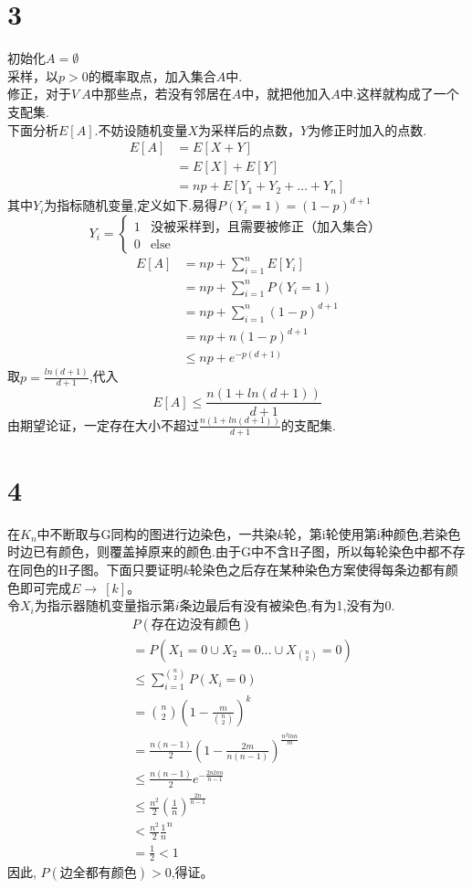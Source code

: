 \documentclass[a4paper,twocolumn]{ctexart}
\begin{document}
\section*{3}
\noindent 初始化$A=\emptyset$\\
采样，以$p>0$的概率取点，加入集合$A$中.\\
修正，对于$V\ A$中那些点，若没有邻居在$A$中，就把他加入$A$中.这样就构成了一个支配集.\\
下面分析$E[A]$.不妨设随机变量$X$为采样后的点数，$Y$为修正时加入的点数.
\begin{align*}
E[A]&=E[X+Y]\\
&=E[X]+E[Y]\\
&=np+E[Y_1+Y_2+\ldots+Y_{n}]
\end{align*}
其中$Y_i$为指标随机变量,定义如下.易得$P(Y_i=1)=(1-p)^{d+1}$
\[Y_i=
\begin{cases}
1 &\text{没被采样到，且需要被修正（加入集合）}\\
0 & \text{else}
\end{cases}
\]
\begin{align*}
E[A]&=np+\sum_{i=1}^{n}E[Y_i]\\
&=np+\sum_{i=1}^{n}P(Y_i=1)\\
&=np+\sum_{i=1}^{n}(1-p)^{d+1}\\
&=np+n(1-p)^{d+1}\\
&\le np+e^{-p(d+1)}
\end{align*}
取$p=\frac{ln(d+1)}{d+1}$,代入
\[
E[A]\le \frac{n(1+ln(d+1))}{d+1}
\]
由期望论证，一定存在大小不超过$\frac{n(1+ln(d+1))}{d+1}$的支配集.
\section*{4}
在$K_n$中不断取与G同构的图进行边染色，一共染$k$轮，第i轮使用第i种颜色,若染色时边已有颜色，则覆盖掉原来的颜色.由于G中不含H子图，所以每轮染色中都不存在同色的H子图。下面只要证明$k$轮染色之后存在某种染色方案使得每条边都有颜色即可完成$E\to\ [k]$。\\
令$X_i$为指示器随机变量指示第$i$条边最后有没有被染色,有为1,没有为0.
\begin{align*}
&P(\text{存在边没有颜色})\\
&=P\left(X_1=0 \cup X_2=0 \ldots \cup X_{\binom{n}{2}}=0\right)\\
&\le \sum_{i=1}^{\binom{n}{2}}P(X_i=0)\\
&=\binom{n}{2} \left(1-\frac{m}{\binom{n}{2}}\right)^k\\
&=\frac{n(n-1)}{2}\left(1-\frac{2m}{n(n-1)}\right)^{\frac{n^2lnn}{m}}\\
&\le \frac{n(n-1)}{2}e^{-\frac{2nlnn}{n-1}}\\
&\le \frac{n^2}{2}\left(\frac{1}{n}\right)^{\frac{2n}{n-1}}\\
&<\frac{n^2}{2}\frac{1}{n}^n\\
&=\frac{1}{2}<1
\end{align*}
因此, $P(\text{边全都有颜色})>0$,得证。
\end{document}
